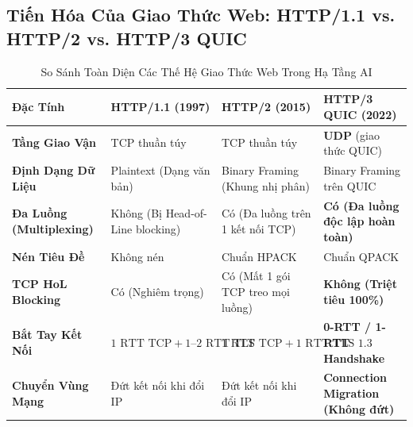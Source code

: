 \subsection{Tiến Hóa Của Giao Thức Web: HTTP/1.1 vs. HTTP/2 vs. HTTP/3 QUIC}
\label{subsec:http-evolution}
\begin{table}[htbp]
\centering
\small
\caption{So Sánh Toàn Diện Các Thế Hệ Giao Thức Web Trong Hạ Tầng AI}
\label{tab:http-evolution}
\begin{tabular}{p{2.8cm}p{3.2cm}p{3.2cm}p{3.5cm}}
\toprule
\textbf{Đặc Tính} & \textbf{HTTP/1.1 (1997)} & \textbf{HTTP/2 (2015)} & \textbf{HTTP/3 QUIC (2022)} \\
\midrule
\textbf{Tầng Giao Vận} & TCP thuần túy & TCP thuần túy & \textbf{UDP} (giao thức QUIC) \\
\textbf{Định Dạng Dữ Liệu} & Plaintext (Dạng văn bản) & Binary Framing (Khung nhị phân) & Binary Framing trên QUIC \\
\textbf{Đa Luồng (Multiplexing)} & Không (Bị Head-of-Line blocking) & Có (Đa luồng trên 1 kết nối TCP) & \textbf{Có (Đa luồng độc lập hoàn toàn)} \\
\textbf{Nén Tiêu Đề} & Không nén & Chuẩn HPACK & Chuẩn QPACK \\
\textbf{TCP HoL Blocking} & Có (Nghiêm trọng) & Có (Mất 1 gói TCP treo mọi luồng) & \textbf{Không (Triệt tiêu 100\%)} \\
\textbf{Bắt Tay Kết Nối} & $1 \text{ RTT TCP} + 1\text{--}2 \text{ RTT TLS}$ & $1 \text{ RTT TCP} + 1 \text{ RTT TLS 1.3}$ & \textbf{0-RTT / 1-RTT Handshake} \\
\textbf{Chuyển Vùng Mạng} & Đứt kết nối khi đổi IP & Đứt kết nối khi đổi IP & \textbf{Connection Migration (Không đứt)} \\
\bottomrule
\end{tabular}
\end{table}


